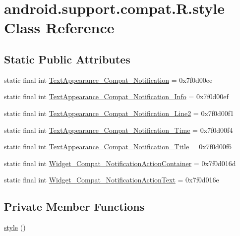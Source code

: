 \hypertarget{classandroid_1_1support_1_1compat_1_1_r_1_1style}{}\section{android.\+support.\+compat.\+R.\+style Class Reference}
\label{classandroid_1_1support_1_1compat_1_1_r_1_1style}
\subsection*{Static Public Attributes}
\begin{DoxyCompactItemize}
\item 
static final int \mbox{\hyperlink{classandroid_1_1support_1_1compat_1_1_r_1_1style_a114bcc978aa842e6026fad3862e972cd}{Text\+Appearance\+\_\+\+Compat\+\_\+\+Notification}} = 0x7f0d00ee
\item 
static final int \mbox{\hyperlink{classandroid_1_1support_1_1compat_1_1_r_1_1style_acda26018c1c14a2dd848265ecdfb8222}{Text\+Appearance\+\_\+\+Compat\+\_\+\+Notification\+\_\+\+Info}} = 0x7f0d00ef
\item 
static final int \mbox{\hyperlink{classandroid_1_1support_1_1compat_1_1_r_1_1style_a98eb833a2bc193d11c113fe9ee60f585}{Text\+Appearance\+\_\+\+Compat\+\_\+\+Notification\+\_\+\+Line2}} = 0x7f0d00f1
\item 
static final int \mbox{\hyperlink{classandroid_1_1support_1_1compat_1_1_r_1_1style_a9110f81c0af6e7ed7ed66ed98149faef}{Text\+Appearance\+\_\+\+Compat\+\_\+\+Notification\+\_\+\+Time}} = 0x7f0d00f4
\item 
static final int \mbox{\hyperlink{classandroid_1_1support_1_1compat_1_1_r_1_1style_a69cbbd95c58f257549c36761ad56924e}{Text\+Appearance\+\_\+\+Compat\+\_\+\+Notification\+\_\+\+Title}} = 0x7f0d00f6
\item 
static final int \mbox{\hyperlink{classandroid_1_1support_1_1compat_1_1_r_1_1style_a8f7c61994ed511066c8c667648fd269b}{Widget\+\_\+\+Compat\+\_\+\+Notification\+Action\+Container}} = 0x7f0d016d
\item 
static final int \mbox{\hyperlink{classandroid_1_1support_1_1compat_1_1_r_1_1style_a96ff4cd097ce36adea6f4badafde3416}{Widget\+\_\+\+Compat\+\_\+\+Notification\+Action\+Text}} = 0x7f0d016e
\end{DoxyCompactItemize}
\subsection*{Private Member Functions}
\begin{DoxyCompactItemize}
\item 
\mbox{\hyperlink{classandroid_1_1support_1_1compat_1_1_r_1_1style_a796b89724fe99e963485e9b3ce6b3b1b}{style}} ()
\end{DoxyCompactItemize}


